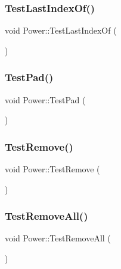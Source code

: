 \mbox{\label{namespace_power_a11303f4f04e214f86e20de0b5b7c01fa}} 
\subsubsection{\texorpdfstring{Test\+Last\+Index\+Of()}{TestLastIndexOf()}}
{\footnotesize\ttfamily void Power\+::\+Test\+Last\+Index\+Of (\begin{DoxyParamCaption}{ }\end{DoxyParamCaption})}

\mbox{\label{namespace_power_a3d4ab2663e62978f111c66a1dfeabace}} 
\subsubsection{\texorpdfstring{Test\+Pad()}{TestPad()}}
{\footnotesize\ttfamily void Power\+::\+Test\+Pad (\begin{DoxyParamCaption}{ }\end{DoxyParamCaption})}

\mbox{\label{namespace_power_a4119a2b48f2dff71b6ca87cc2f94b71e}} 
\subsubsection{\texorpdfstring{Test\+Remove()}{TestRemove()}}
{\footnotesize\ttfamily void Power\+::\+Test\+Remove (\begin{DoxyParamCaption}{ }\end{DoxyParamCaption})}

\mbox{\label{namespace_power_ac4dfc487f0585994b48205120571f03a}} 
\subsubsection{\texorpdfstring{Test\+Remove\+All()}{TestRemoveAll()}}
{\footnotesize\ttfamily void Power\+::\+Test\+Remove\+All (\begin{DoxyParamCaption}{ }\end{DoxyParamCaption})}

